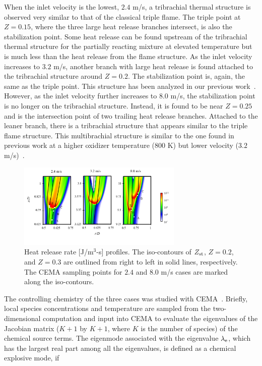 \documentclass[review,3p,times]{elsarticle}
\begin{document}
When the inlet velocity is the lowest, $2.4$ m/s, a tribrachial thermal structure is observed very similar to that of the classical triple flame.  The triple point at $Z = 0.15$, where the three large heat release branches intersect, is also the stabilization point.  Some heat release can be found upstream of the tribrachial thermal structure for the partially reacting mixture at elevated temperature but is much less than the heat release from the flame structure.  As the inlet velocity increases to $3.2$ m/s, another branch with large heat release is found attached to the tribrachial structure around $Z = 0.2$.  The stabilization point is, again, the same as the triple point.  This structure has been analyzed in our previous work~\cite{deng15}.  However, as the inlet velocity further increases to $8.0$ m/s, the stabilization point is no longer on the tribrachial structure.  Instead, it is found to be near $Z = 0.25$ and is the intersection point of two trailing heat release branches.  Attached to the leaner branch, there is a tribrachial structure that appears similar to the triple flame structure.  This multibrachial structure is similar to the one found in previous work at a higher oxidizer temperature ($800$ K) but lower velocity ($3.2$ m/s)~\cite{deng15}.

\begin{figure}[t]
  \centering
  \scriptsize
  \vspace{-0.1in}
  \includegraphics[width=0.7\textwidth]{HRR_V.png}
  \normalsize
  \vspace{-0.4in}
  \caption{Heat release rate [J/m$^3$-s] profiles.  The iso-contours of $Z_{\rm st}$, $Z = 0.2$, and $Z = 0.3$ are outlined from right to left in solid lines, respectively.  The CEMA sampling points for $2.4$ and $8.0$ m/s cases are marked along the iso-contours.}
  \label{fig:HRR_V}
\end{figure}

\textcolor{cm}{The controlling chemistry of the three cases was studied with CEMA~\cite{lu10,shan12}.   Briefly, local species concentrations and temperature are sampled from the two-dimensional computation and input into CEMA to evaluate the eigenvalues of the Jacobian matrix ($K + 1$ by $K + 1$, where $K$ is the number of species) of the chemical source terms.  The eigenmode associated with the eigenvalue $\lambda_{\rm e}$, which has the largest real part among all the eigenvalues, is defined as a chemical explosive mode, if}
\end{document}
